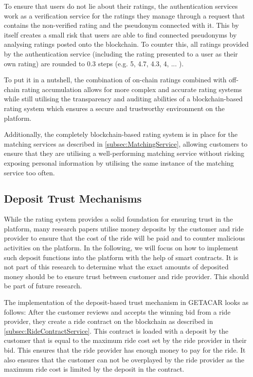 To ensure that users do not lie about their ratings, the authentication services work as a verification service for the ratings they manage through a request that contains the non-verified rating and the pseudonym connected with it. This by itself creates a small risk that users are able to find connected pseudonyms by analysing ratings posted onto the blockchain. To counter this, all ratings provided by the authentication service (including the rating presented to a user as their own rating) are rounded to 0.3 steps (e.g. 5, 4.7, 4.3, 4, ... ). 


To put it in a nutshell, the combination of on-chain ratings combined with off-chain rating accumulation allows for more complex and accurate rating systems while still utilising the transparency and auditing abilities of a blockchain-based rating system which ensures a secure and trustworthy environment on the platform.

Additionally, the completely blockchain-based rating system is in place for the matching services as described in \ref{subsec:MatchingService}, allowing customers to ensure that they are utilising a well-performing matching service without risking exposing personal information by utilising the same instance of the matching service too often.

\subsection{Deposit Trust Mechanisms}\label{subsec:DepositTrust}
While the rating system provides a solid foundation for ensuring trust in the platform, many research papers utilise money deposits by the customer and ride provider to ensure that the cost of the ride will be paid and to counter malicious activities on the platform. In the following, we will focus on how to implement such deposit functions into the platform with the help of smart contracts. It is not part of this research to determine what the exact amounts of deposited money should be to ensure trust between customer and ride provider. This should be part of future research.

The implementation of the deposit-based trust mechanism in GETACAR looks as follows:
After the customer reviews and accepts the winning bid from a ride provider, they create a ride contract on the blockchain as described in \ref{subsec:RideContractService}. This contract is loaded with a deposit by the customer that is equal to the maximum ride cost set by the ride provider in their bid. This ensures that the ride provider has enough money to pay for the ride. It also ensures that the customer can not be overplayed by the ride provider as the maximum ride cost is limited by the deposit in the contract. 

